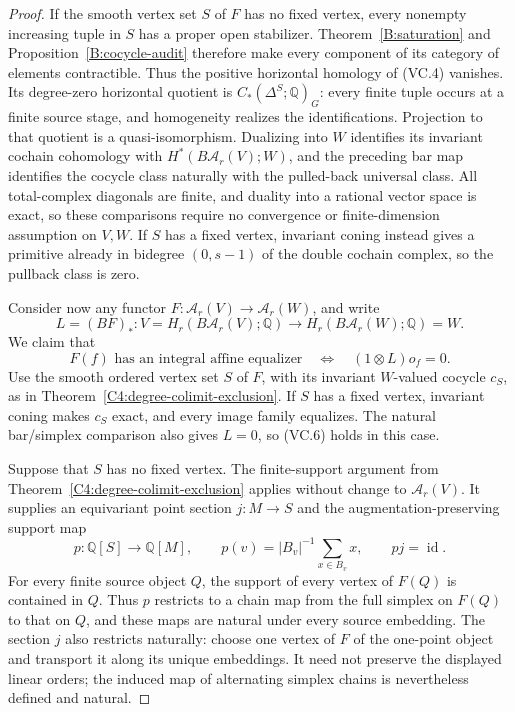 \begin{proof}
If the smooth vertex set $S$ of $F$ has no fixed vertex, every
nonempty increasing tuple in $S$ has a proper open stabilizer.
Theorem~\ref{B:saturation} and
Proposition~\ref{B:cocycle-audit} therefore make every component
of its category of elements contractible. Thus the positive
horizontal homology of (VC.4) vanishes. Its degree-zero
horizontal quotient is $C_*(\Delta^S;\mathbb Q)_G$: every finite
tuple occurs at a finite source stage, and homogeneity realizes
the identifications. Projection to that quotient is a
quasi-isomorphism. Dualizing into $W$ identifies its invariant
cochain cohomology with $H^*(B\mathcal A_r(V);W)$, and the
preceding bar map identifies the cocycle class naturally with
the pulled-back universal class. All total-complex diagonals
are finite, and duality into a rational vector space is exact,
so these comparisons require no convergence or finite-dimension
assumption on $V,W$. If $S$ has a fixed vertex, invariant coning
instead gives a primitive already in bidegree $(0,s-1)$ of
the double cochain complex, so the pullback class is zero.

Consider now any functor
$F:\mathcal A_r(V)\to\mathcal A_r(W)$, and write
\[
 L=(BF)_*:V=H_r(B\mathcal A_r(V);\mathbb Q)
       \longrightarrow H_r(B\mathcal A_r(W);\mathbb Q)=W.
 \tag{VC.5}
\]
We claim that
\[
 F(f)\text{ has an integral affine equalizer}
 \quad\Longleftrightarrow\quad
 (1\otimes L)o_f=0.
 \tag{VC.6}
\]
Use the smooth ordered vertex set $S$ of $F$, with its invariant
$W$-valued cocycle $c_S$, as in Theorem~\ref{C4:degree-colimit-exclusion}.
If $S$ has a fixed vertex, invariant coning makes $c_S$ exact,
and every image family equalizes. The natural bar/simplex
comparison also gives $L=0$, so (VC.6) holds in this case.

Suppose that $S$ has no fixed vertex. The finite-support argument
from Theorem~\ref{C4:degree-colimit-exclusion} applies without
change to $\mathcal A_r(V)$. It supplies an equivariant point
section $j:M\to S$ and the augmentation-preserving support map
\[
 p:\mathbb Q[S]\longrightarrow\mathbb Q[M],
 \qquad p(v)=|B_v|^{-1}\sum_{x\in B_v}x,
 \qquad pj=\operatorname{id}.
\]
For every finite source object $Q$, the support of every vertex
of $F(Q)$ is contained in $Q$. Thus $p$ restricts to a chain map
from the full simplex on $F(Q)$ to that on $Q$, and these maps
are natural under every source embedding. The section $j$ also
restricts naturally: choose one vertex of $F$ of the one-point
object and transport it along its unique embeddings.
It need not preserve the displayed linear orders; the induced
map of alternating simplex chains is nevertheless defined and
natural.


\end{proof}
